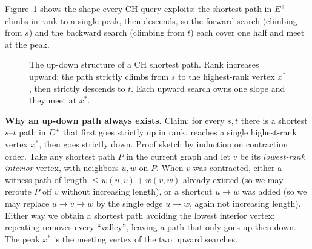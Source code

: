 Figure~\ref{ch08:fig-updown} shows the shape every CH query exploits: the
shortest path in $E^{+}$ climbs in rank to a single peak, then descends, so the
forward search (climbing from $s$) and the backward search (climbing from $t$)
each cover one half and meet at the peak.

\begin{figure}[H]
\centering
{}
\caption{The up-down structure of a CH shortest path. Rank increases upward; the
path strictly climbs from $s$ to the highest-rank vertex $x^{*}$, then strictly
descends to $t$. Each upward search owns one slope and they meet at $x^{*}$.}
\label{ch08:fig-updown}
\end{figure}

\begin{whybox}
\textbf{Why an up-down path always exists.} Claim: for every $s,t$ there is a
shortest $s$--$t$ path in $E^{+}$ that first goes strictly up in rank, reaches a
single highest-rank vertex $x^{*}$, then goes strictly down. Proof sketch by
induction on contraction order. Take any shortest path $P$ in the current graph
and let $v$ be its \emph{lowest-rank interior} vertex, with neighbors $u,w$ on
$P$. When $v$ was contracted, either a witness path of length $\le
w(u,v)+w(v,w)$ already existed (so we may reroute $P$ off $v$ without increasing
length), or a shortcut $u\to w$ was added (so we may replace $u\to v\to w$ by the
single edge $u\to w$, again not increasing length). Either way we obtain a
shortest path avoiding the lowest interior vertex; repeating removes every
``valley'', leaving a path that only goes up then down. The peak $x^{*}$ is the
meeting vertex of the two upward searches.
\end{whybox}

